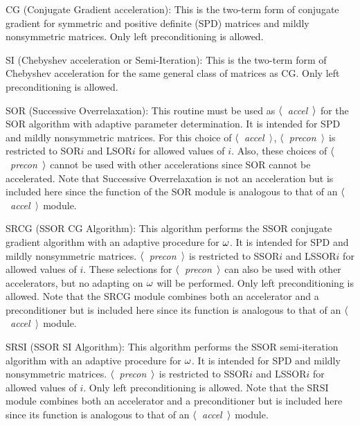 \bigskip
\begin{list}{}{
               \leftmargin 1.00in \rightmargin 0.25in}
\item[CG \hfill](Conjugate Gradient acceleration):
      This is the two-term form of conjugate gradient for
      symmetric and positive definite (SPD) matrices and mildly
      nonsymmetric matrices.  Only left preconditioning is
      allowed.
 
\item[SI \hfill](Chebyshev acceleration or Semi-Iteration):
      This is the two-term form of Chebyshev acceleration for
      the same general class of matrices as CG.  Only left
      preconditioning is allowed.
 
\item[SOR \hfill](Successive Overrelaxation):
      This routine must be used as $\langle$~{\em accel}~$\rangle$
      for the SOR algorithm with adaptive parameter determination.  
      It is intended for SPD and mildly
      nonsymmetric matrices.  For this choice of 
      $\langle$~{\em accel}~$\rangle$, $\langle$~{\em precon}~$\rangle$
      is restricted to SOR$i$ and LSOR$i$ for allowed values 
      of $i$.  Also, these choices of $\langle$~{\em precon}~$\rangle$ 
      cannot be used with other accelerations since SOR cannot 
      be accelerated.  Note that Successive Overrelaxation is 
      not an acceleration but is included here since the
      function of the SOR module is analogous to that of an
      $\langle$~{\em accel}~$\rangle$ module.
 
\item[SRCG \hfill](SSOR CG Algorithm):
      This algorithm performs the SSOR conjugate gradient
      algorithm with an adaptive procedure for $\omega$.  It is 
      intended for SPD and mildly nonsymmetric matrices. 
      $\langle$~{\em precon}~$\rangle$ is restricted to SSOR$i$ and 
      LSSOR$i$ for allowed values of $i$.  These selections 
      for $\langle$~{\em precon}~$\rangle$ can also be used with other 
      accelerators, but no adapting on $\omega$ will be performed.
      Only left preconditioning is allowed.  Note that the SRCG 
      module combines both an accelerator and a preconditioner 
      but is included here since its function is analogous to 
      that of an $\langle$~{\em accel}~$\rangle$ module.
 
\item[SRSI \hfill](SSOR SI Algorithm):
      This algorithm performs the SSOR semi-iteration
      algorithm with an adaptive procedure for $\omega$.  It is 
      intended for SPD and mildly nonsymmetric matrices.  
      $\langle$~{\em precon}~$\rangle$ is restricted to SSOR$i$ and 
      LSSOR$i$ for allowed values of $i$.  Only left 
      preconditioning is allowed.  Note that the SRSI module 
      combines both an accelerator and a preconditioner but is 
      included here since its function is analogous to that of 
      an $\langle$~{\em accel}~$\rangle$ module.
 

\end{list}
